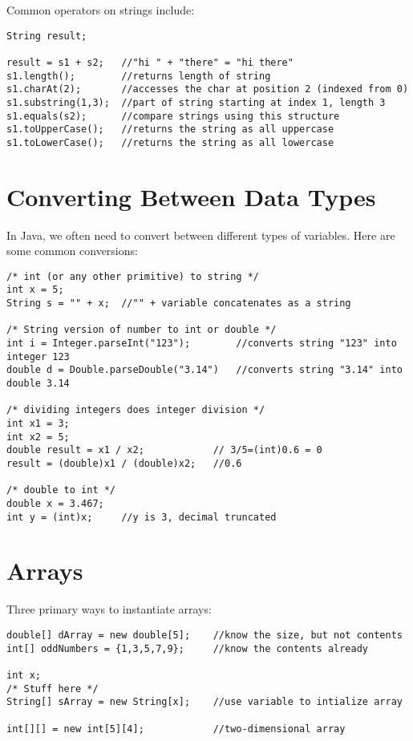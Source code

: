 \documentclass[paper=a4, fontsize=11pt, parskip=full]{scrartcl} %
\numberwithin{equation}{section} %
\numberwithin{figure}{section} %
\numberwithin{table}{section} %
\begin{document}
Common operators on strings include:

\begin{lstlisting}
String result;

result = s1 + s2; 	//"hi " + "there" = "hi there"
s1.length();		//returns length of string
s1.charAt(2);		//accesses the char at position 2 (indexed from 0)
s1.substring(1,3);	//part of string starting at index 1, length 3
s1.equals(s2);		//compare strings using this structure
s1.toUpperCase();	//returns the string as all uppercase
s1.toLowerCase();	//returns the string as all lowercase
\end{lstlisting}

\section{Converting Between Data Types}

In Java, we often need to convert between different types of variables. Here are some common conversions:

\begin{lstlisting}
/* int (or any other primitive) to string */
int x = 5;
String s = "" + x;	//"" + variable concatenates as a string

/* String version of number to int or double */
int i = Integer.parseInt("123");		//converts string "123" into integer 123
double d = Double.parseDouble("3.14")	//converts string "3.14" into double 3.14

/* dividing integers does integer division */
int x1 = 3;
int x2 = 5;
double result = x1 / x2; 			// 3/5=(int)0.6 = 0
result = (double)x1 / (double)x2;	//0.6

/* double to int */
double x = 3.467;
int y = (int)x;		//y is 3, decimal truncated
\end{lstlisting}


\section{Arrays}

Three primary ways to instantiate arrays:

\begin{lstlisting}
double[] dArray = new double[5];	//know the size, but not contents
int[] oddNumbers = {1,3,5,7,9};		//know the contents already

int x;
/* Stuff here */
String[] sArray = new String[x];	//use variable to intialize array

int[][] = new int[5][4];			//two-dimensional array
\end{lstlisting}
\end{document}
